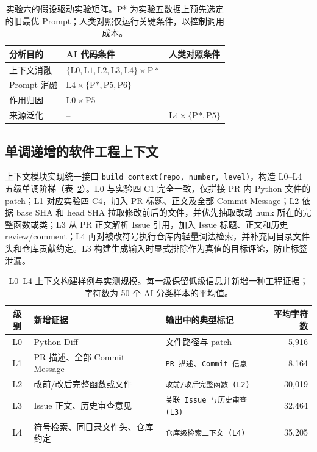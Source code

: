 \documentclass{experimentreport}
\begin{document}
{\begin{table}[H]
\centering
\caption{实验六的假设驱动实验矩阵。P* 为实验五数据上预先选定的旧最优 Prompt；人类对照仅运行关键条件，以控制调用成本。}
\label{tab:exp-matrix}
\small
\begin{tabular}{lll}
\toprule
分析目的 & AI 代码条件 & 人类对照条件 \\
\midrule
上下文消融 & $\{\mathrm{L0,L1,L2,L3,L4}\}\times\mathrm{P*}$ & -- \\
Prompt 消融 & $\mathrm{L4}\times\{\mathrm{P*,P5,P6}\}$ & -- \\
作用归因 & $\mathrm{L0}\times\mathrm{P5}$ & -- \\
来源泛化 & -- & $\mathrm{L4}\times\{\mathrm{P*,P5}\}$ \\
\bottomrule
\end{tabular}
\end{table}

\subsection{单调递增的软件工程上下文}

上下文模块实现统一接口 \texttt{build\_context(repo, number, level)}，构造 L0--L4 五级单调阶梯（表~\ref{tab:context-levels}）。L0 与实验四 C1 完全一致，仅拼接 PR 内 Python 文件的 patch；L1 对应实验四 C4，加入 PR 标题、正文及全部 Commit Message；L2 依据 base SHA 和 head SHA 拉取修改前后的文件，并优先抽取改动 hunk 所在的完整函数或类；L3 从 PR 正文解析 Issue 引用，加入 Issue 标题、正文和历史 review/comment；L4 再对被改符号执行仓库内轻量词法检索，并补充同目录文件头和仓库贡献约定。L3 构建生成输入时显式排除作为真值的目标评论，防止标签泄漏。

\begin{table}[H]
\centering
\caption{L0--L4 上下文构建样例与实测规模。每一级保留低级信息并新增一种工程证据；字符数为 50 个 AI 分类样本的平均值。}
\label{tab:context-levels}
\small
\begin{tabular}{cllr}
\toprule
级别 & 新增证据 & 输出中的典型标记 & 平均字符数 \\
\midrule
L0 & Python Diff & 文件路径与 patch & 5,916 \\
L1 & PR 描述、全部 Commit Message & \texttt{PR 描述}、\texttt{Commit 信息} & 8,164 \\
L2 & 改前/改后完整函数或文件 & \texttt{改前/改后完整函数 (L2)} & 30,019 \\
L3 & Issue 正文、历史审查意见 & \texttt{关联 Issue 与历史审查 (L3)} & 32,464 \\
L4 & 符号检索、同目录文件头、仓库约定 & \texttt{仓库级检索上下文 (L4)} & 35,205 \\
\bottomrule
\end{tabular}
\end{table}

}
\end{document}
